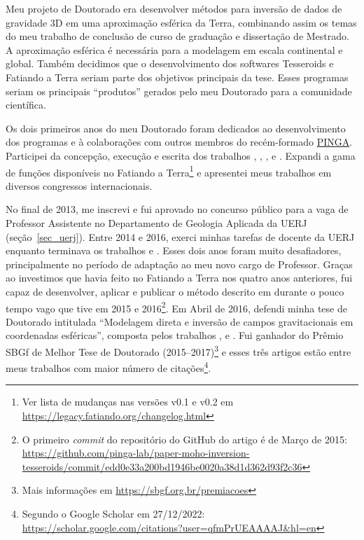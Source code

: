 \documentclass[10pt,a4paper,oneside]{book}
\begin{document}
Meu projeto de Doutorado era desenvolver métodos para inversão de dados de
gravidade 3D em uma aproximação esférica da Terra, combinando assim os temas
do meu trabalho de conclusão de curso de graduação e dissertação de Mestrado.
A aproximação esférica é necessária para a modelagem em escala continental e
global.
Também decidimos que o desenvolvimento dos softwares Tesseroids e Fatiando a
Terra seriam parte dos objetivos principais da tese.
Esses programas seriam os principais ``produtos'' gerados pelo meu Doutorado
para a comunidade científica.

Os dois primeiros anos do meu Doutorado foram dedicados ao desenvolvimento dos
programas e à colaborações com outros membros do recém-formado
\href{https://www.pinga-lab.org}{PINGA}.
Participei da concepção, execução e escrita dos trabalhos
\citet{OliveiraJr2013}, \citet{Melo2013}, \citet{Carlos2014},
\citet{OliveiraJr2015} e \citet{Carlos2016}.
Expandi a gama de funções disponíveis no Fatiando a Terra\footnote{Ver lista
de mudanças nas versões v0.1 e v0.2 em \url{https://legacy.fatiando.org/changelog.html}}
e apresentei meus trabalhos em diversos congressos internacionais.

No final de 2013, me inscrevi e fui aprovado no concurso público para a vaga de
Professor Assistente no Departamento de Geologia Aplicada da UERJ
(seção~\ref{sec_uerj}).
Entre 2014 e 2016, exerci minhas tarefas de docente da UERJ enquanto terminava
os trabalhos \citet{Uieda2016} e \citet{Uieda2017}.
Esses dois anos foram muito desafiadores, principalmente no período de
adaptação ao meu novo cargo de Professor.
Graças ao investimos que havia feito no Fatiando a Terra nos quatro anos
anteriores, fui capaz de desenvolver, aplicar e publicar o método descrito em
\citet{Uieda2017} durante o pouco tempo vago que tive em 2015 e
2016\footnote{O primeiro \textit{commit} do repositório do GitHub do artigo é
de Março de 2015: \url{https://github.com/pinga-lab/paper-moho-inversion-tesseroids/commit/edd0e33a200bd1946be0020a38d1d362d93f2c36}}.
Em Abril de 2016, defendi minha tese de Doutorado intitulada ``Modelagem direta
e inversão de campos gravitacionais em coordenadas esféricas'', composta pelos
trabalhos \citet{Uieda2013}, \citet{Uieda2016} e \citet{Uieda2017}.
Fui ganhador do Prêmio SBGf de Melhor Tese de Doutorado
(2015--2017)\footnote{Mais informações em \url{https://sbgf.org.br/premiacoes}}
e esses três artigos estão entre meus trabalhos com maior número de
citações\footnote{Segundo o Google Scholar em 27/12/2022:
\url{https://scholar.google.com/citations?user=qfmPrUEAAAAJ&hl=en}}.
\end{document}
